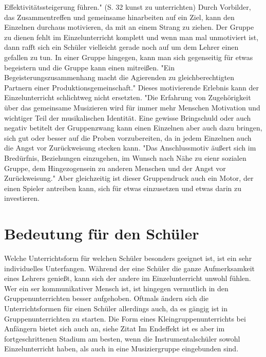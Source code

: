Effektivitätssteigerung führen." (S. 32 kunst zu unterrichten) Durch Vorbilder,
das Zusammentreffen und gemeinsame hinarbeiten auf ein Ziel, kann den Einzelnen
durchaus motivieren, da mit an einem Strang zu ziehen. Der Gruppe zu dienen
fehlt im Einzelunterricht komplett und wenn man mal unmotiviert ist, dann rafft
sich ein Schüler vielleicht gerade noch auf um dem Lehrer einen gefallen zu tun.
In einer Gruppe hingegen, kann man sich gegenseitig für etwas begeistern und die
Gruppe kann einen mitreißen. "Ein Begeisterungszusammenhang macht die Agierenden zu gleichberechtigten
Partnern einer Produktionsgemeinschaft." \autocite[198]{busch:grundwissen_instrumentalpaedagogik}
Dieses motivierende Erlebnis kann der Einzelunterricht schlichtweg nicht
ersetzten. "Die Erfahrung von Zugehörigkeit über das gemeinsame Musizieren wird für immer
mehr Menschen Motivation und wichtiger Teil der musikalischen
Identität.%
Eine gewisse Bringschuld oder auch negativ betitelt der Gruppenzwang kann einen
Einzelnen aber auch dazu bringen, sich gut oder besser auf die Proben
vorzubereiten, da in jedem Einzelnen auch die Angst vor Zurückweisung stecken
kann. "Das Anschlussmotiv äußert sich im Bredürfnis, Beziehungen
einzugehen,
im Wunsch
nach Nähe zu eienr sozialen Gruppe, dem Hingezogensein zu anderen Menschen und
der Angst vor Zurückweisung." \autocite[120ff]{losert:die_kunst_zu_unterrichten}
Aber gleichzeitig ist dieser Gruppendruck auch ein Motor, der einen Spieler
antreiben kann, sich für etwas einzusetzen und etwas darin zu investieren.









\section{Bedeutung für den Schüler}
Welche Unterrichtsform für welchen Schüler besonders geeignet ist, ist ein sehr
individuelles Unterfangen. Während der eine Schüler die ganze Aufmerksamkeit
eines Lehrers genießt, kann sich der andere im Einzelunterricht unwohl fühlen.
Wer ein ser kommunikativer Mensch ist, ist hingegen vermutlich in den
Gruppenunterrichten besser aufgehoben. Oftmals ändern sich die Unterrichtsformen
für einen Schüler allerdings auch, da es gängig ist in Gruppenunterrichten zu
starten. Die Form eines Kleingruppenunterrichts bei Anfängern bietet sich auch
an, siehe Zitat \autocite[220]{busch:grundwissen_instrumentalpaedagogik}
Im Endeffekt ist es aber im fortgeschrittenen Stadium am besten, wenn die
Instrumentalschüler sowohl Einzelunterricht haben, als auch in eine
Musiziergruppe eingebunden sind. 

